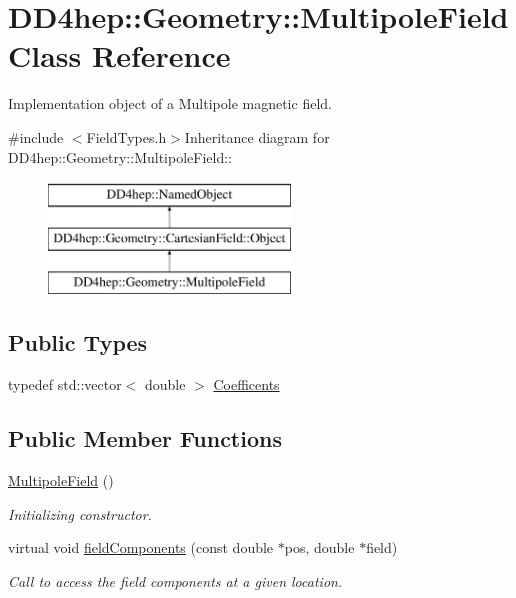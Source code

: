 \hypertarget{class_d_d4hep_1_1_geometry_1_1_multipole_field}{
\section{DD4hep::Geometry::MultipoleField Class Reference}
\label{class_d_d4hep_1_1_geometry_1_1_multipole_field}
}


Implementation object of a Multipole magnetic field.  


{\ttfamily \#include $<$FieldTypes.h$>$}Inheritance diagram for DD4hep::Geometry::MultipoleField::\begin{figure}[H]
\begin{center}
\leavevmode
\includegraphics[height=3cm]{class_d_d4hep_1_1_geometry_1_1_multipole_field}
\end{center}
\end{figure}
\subsection*{Public Types}
\begin{DoxyCompactItemize}
\item 
typedef std::vector$<$ double $>$ \hyperlink{class_d_d4hep_1_1_geometry_1_1_multipole_field_a760b1b7561c93dd8438ea523cbc660bc}{Coefficents}
\end{DoxyCompactItemize}
\subsection*{Public Member Functions}
\begin{DoxyCompactItemize}
\item 
\hyperlink{class_d_d4hep_1_1_geometry_1_1_multipole_field_a66745189fa088d26122bbf841eb18f90}{MultipoleField} ()
\begin{DoxyCompactList}\small\item\em Initializing constructor. \item\end{DoxyCompactList}\item 
virtual void \hyperlink{class_d_d4hep_1_1_geometry_1_1_multipole_field_a06782e6f0fbdfcf53394ee5dda83b052}{fieldComponents} (const double $\ast$pos, double $\ast$field)
\begin{DoxyCompactList}\small\item\em Call to access the field components at a given location. \item\end{DoxyCompactList}\end{DoxyCompactItemize}
